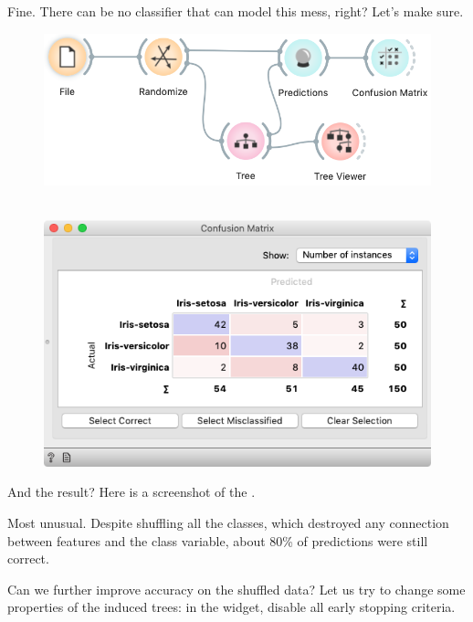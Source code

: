 Fine. There can be no classifier that can model this mess, right? Let’s make sure.

\begin{figure}[h]
    \includegraphics[scale=0.4]{workflow_classification.png}
    \caption{$\;$} %
\end{figure}

\begin{figure}
    \includegraphics[scale=0.35]{confusion_randomized.png}
\end{figure}

And the result? Here is a screenshot of the .

Most unusual. Despite shuffling all the classes, which destroyed any connection between features and the class variable, about 80\% of predictions were still correct.

\clearpage

Can we further improve accuracy on the shuffled data? Let us try to change some properties of the induced trees: in the  widget, disable all early stopping criteria.

